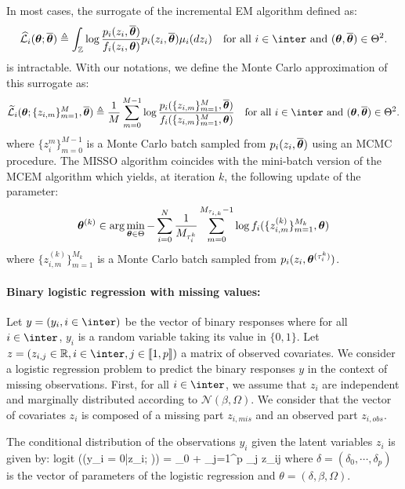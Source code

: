 \documentclass[11pt]{article}
\theoremstyle{t}
\begin{document}
In most cases, the surrogate of the incremental EM algorithm defined as:
\begin{equation}
\sur{i}{\param}{\op} \triangleq \int_{\zset}{\log \frac{p_i(z_i,\op)}{f_i(z_i,\param)}p_i(z_i,\op)\mu_i(dz_i)}\quad \textrm{for all $i \in \inter$ and $(\param,\op) \in \Theta^2$}.
\end{equation}
is intractable. With our notations, we define the Monte Carlo approximation of this surrogate as:
\begin{equation}\label{eq:mcemsurrogate}
    \ssur{i}{\param}{\{ z_{i,m} \}_{m=1}^M}{\op} \triangleq  \frac{1}{M}\sum_{m=0}^{M-1}{\log \frac{p_i(\{ z_{i,m} \}_{m=1}^M,\op)}{f_i(\{ z_{i,m} \}_{m=1}^M,\param)}}\quad \textrm{for all $i \in \inter$ and $(\param,\op) \in \Theta^2$}.
\end{equation}
where $\{z_i^{m}\}_{m=0}^{M-1}$ is a Monte Carlo batch sampled from $p_i(z_i,\overline{{\bm{\theta}}})$ using an MCMC procedure. The MISSO algorithm coincides with the mini-batch version of the MCEM algorithm which yields, at iteration $k$, the following update of the parameter:
\begin{equation}\label{eq:misso.mcem}
    {{\bm{\theta}}}^{(k)} \in \arg \min \limits_{{\bm{\theta}} \in \Theta} -\sum_{i=0}^{N}{\frac{1}{M_{\tau_i^k}}\sum_{m=0}^{M_{\tau_{i,k}}-1}{\log f_i(\{ z_{i,m}^{(k)} \}_{m=1}^{M_k},{\bm{\theta}})}}
\end{equation}
where $\{ z_{i,m}^{(k)} \}_{m=1}^{M_k}$ is a Monte Carlo batch sampled from $p_i(z_i,{{\bm{\theta}}}^{(\tau_i^k)})$.


\paragraph{Binary logistic regression with missing values:}
Let $y = (y_i, i \in \inter)$ be the vector of binary responses where for all $i \in \inter$, $y_i $ is a random variable taking its value in $\{0,1\}$. 
Let $z = (z_{i,j} \in \rset, i \in \inter, j \in \llbracket 1, p \rrbracket)$ a matrix of observed covariates.
We consider a logistic regression problem to predict the binary responses $y$ in the context of missing observations.
First, for all $i \in \inter$, we assume that $z_i$ are independent and marginally distributed according to $\mathcal{N}(\beta, \Omega)$. 
We consider that the vector of covariates $z_i$ is composed of a missing part $z_{i,mis}$ and an observed part $z_{i,obs}$.

The conditional distribution of the observations $y_i$ given the latent variables $z_i$ is given by:
\beq\label{eq:logistic}
\textrm{logit} ((y_{i} = 0|z_i; \theta)) = \delta_0 + \sum_{j=1}^p \delta_j z_{ij}
\eeq
where $\delta = (\delta_0, \cdots, \delta_p)$ is the vector of parameters of the logistic regression and $\theta = (\delta, \beta, \Omega)$.
\end{document}
